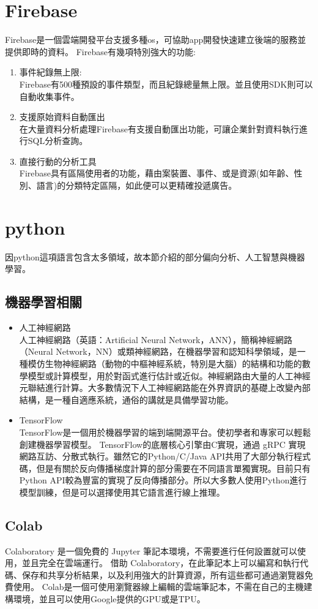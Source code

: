 \section{Firebase}
Firebase是一個雲端開發平台支援多種os，可協助app開發快速建立後端的服務並提供即時的資料。\cite{name23}
Firebase有幾項特別強大的功能:
\begin{enumerate}[1.]
	\item 事件紀錄無上限:\\
	Firebase有500種預設的事件類型，而且紀錄總量無上限。並且使用SDK則可以自動收集事件。
	\item 支援原始資料自動匯出\\
	在大量資料分析處理Firebase有支援自動匯出功能，可讓企業針對資料執行進行SQL分析查詢。
	\item 直接行動的分析工具\\
	Firebase具有區隔使用者的功能，藉由案裝置、事件、或是資源(如年齡、性別、語言)的分類特定區隔，如此便可以更精確投遞廣告。\cite{name22}
\end{enumerate}

\section{python}
因python這項語言包含太多領域，故本節介紹的部分偏向分析、人工智慧與機器學習。
\subsection{機器學習相關}
\begin{itemize}
	\item 人工神經網路\\
	人工神經網路（英語：Artificial Neural Network，ANN），簡稱神經網路（Neural Network，NN）或類神經網路，在機器學習和認知科學領域，是一種模仿生物神經網路（動物的中樞神經系統，特別是大腦）的結構和功能的數學模型或計算模型，用於對函式進行估計或近似。神經網路由大量的人工神經元聯結進行計算。大多數情況下人工神經網路能在外界資訊的基礎上改變內部結構，是一種自適應系統，通俗的講就是具備學習功能。\cite{name16}
	\item TensorFlow\\
	TensorFlow是一個用於機器學習的端到端開源平台。使初學者和專家可以輕鬆創建機器學習模型。\cite{name17}
	TensorFlow的底層核心引擎由C實現，通過 gRPC 實現網路互訪、分散式執行。雖然它的Python/C/Java API共用了大部分執行程式碼，但是有關於反向傳播梯度計算的部分需要在不同語言單獨實現。目前只有Python API較為豐富的實現了反向傳播部分。所以大多數人使用Python進行模型訓練，但是可以選擇使用其它語言進行線上推理。 \cite{name18}
\end{itemize}

\subsection{Colab}
Colaboratory 是一個免費的 Jupyter 筆記本環境，不需要進行任何設置就可以使用，並且完全在雲端運行。
借助 Colaboratory，在此筆記本上可以編寫和執行代碼、保存和共享分析結果，以及利用強大的計算資源，所有這些都可通過瀏覽器免費使用。\cite{name19}
Colab是一個可使用瀏覽器線上編輯的雲端筆記本，不需在自己的主機建構環境，並且可以使用Google提供的GPU或是TPU。
